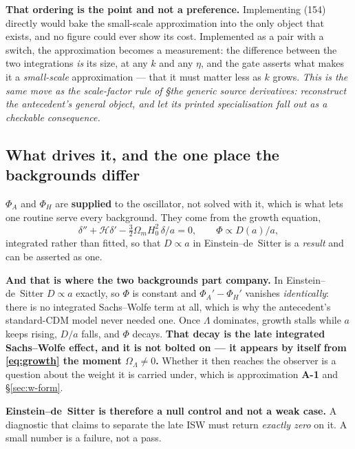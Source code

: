 \textbf{That ordering is the point and not a preference.} Implementing (154)
directly would bake the small-scale approximation into the only object that
exists, and no figure could ever show its cost. Implemented as a pair with a
switch, the approximation becomes a measurement: the difference between the two
integrations \emph{is} its size, at any $k$ and any $\eta$, and the gate asserts
what makes it a \emph{small-scale} approximation --- that it must matter less as
$k$ grows. \emph{This is the same move as the scale-factor rule of
\S\emph{the generic source derivatives}: reconstruct the antecedent's general
object, and let its printed specialisation fall out as a checkable
consequence.}

\subsection{What drives it, and the one place the backgrounds differ}

$\Phi_A$ and $\Phi_H$ are \textbf{supplied} to the oscillator, not solved with
it, which is what lets one routine serve every background. They come from the
growth equation,
\begin{equation}
  \delta''+\mathcal H\delta'-\tfrac32\Omega_m H_0^2\,\delta/a=0,
  \qquad
  \Phi\propto D(a)/a ,
  \label{eq:growth}
\end{equation}
integrated rather than fitted, so that $D\propto a$ in Einstein--de~Sitter is a
\emph{result} and can be asserted as one.

\textbf{And that is where the two backgrounds part company.} In
Einstein--de~Sitter $D\propto a$ exactly, so $\Phi$ is constant and
$\Phi_A'-\Phi_H'$ vanishes \emph{identically}: there is no integrated
Sachs--Wolfe term at all, which is why the antecedent's standard-CDM model never
needed one. Once $\Lambda$ dominates, growth stalls while $a$ keeps rising,
$D/a$ falls, and $\Phi$ decays. \textbf{That decay is the late integrated
Sachs--Wolfe effect, and it is not bolted on --- it appears by itself from
\eqref{eq:growth} the moment $\Omega_\Lambda\neq0$.} Whether it then reaches
the observer is a question about the weight it is carried under, which is
approximation \textbf{A-1} and \S\ref{sec:w-form}.

\textbf{Einstein--de~Sitter is therefore a null control and not a weak case.}
A diagnostic that claims to separate the late ISW must return \emph{exactly
zero} on it. A small number is a failure, not a pass.


